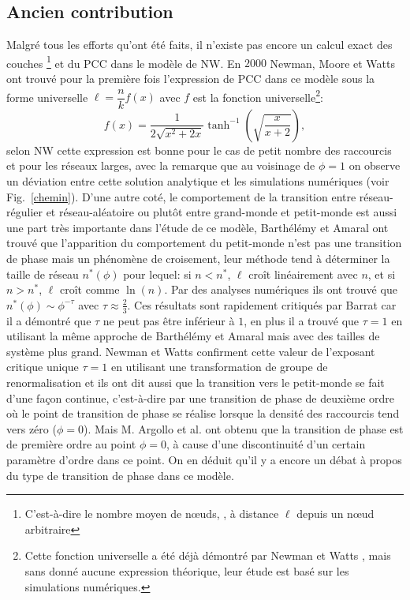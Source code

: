 \subsection{Ancien contribution}
Malgré tous les  efforts qu'ont été faits, il n'existe pas encore un calcul exact des couches \footnote{ C'est-à-dire le nombre moyen de nœuds, \nl, à distance $\ell$ depuis un nœud arbitraire} et du PCC dans le modèle de NW. En $2000$ Newman, Moore et Watts \cite{Newman-al2000} ont trouvé pour la première fois l'expression de PCC dans ce modèle sous la forme universelle $\ell=\dfrac{n}{k}f(x)$ avec $f$ est la fonction universelle\footnote{Cette fonction universelle a été déjà démontré par Newman et Watts \cite{Newman-Watts1999}, mais sans donné aucune expression théorique, leur étude est basé sur les simulations numériques.}:
\begin{equation}
f(x)=\frac{1}{2\sqrt{x^2+2x}}\tanh^{-1}(\sqrt{\frac{x}{x+2}}),\label{eq-ws}
\end{equation}
 selon NW cette expression est bonne pour le cas de petit nombre des raccourcis et pour les réseaux larges, avec la remarque que au voisinage de $\phi=1$ on observe un déviation entre 
 cette solution analytique et les simulations numériques (voir Fig.~\ref{chemin}). D'une autre coté, le comportement de la transition entre  réseau-régulier et  réseau-aléatoire ou plutôt entre  grand-monde et petit-monde est aussi une part très importante dans l'étude de ce modèle, Barthélémy et Amaral \cite{Barthelemy-Amaral1999} ont trouvé que l'apparition du comportement du petit-monde n'est pas une transition de phase mais un phénomène de croisement, leur méthode tend à déterminer la taille de réseau $n^*(\phi)$ pour lequel: si $n<n^*$, $\ell$ croît linéairement avec $n$, et si $n>n^*$, $\ell$ croît comme $\ln(n)$. Par des analyses numériques ils ont trouvé que $n^*(\phi)\sim\phi^{-\tau}$ avec 
$\tau\approx\frac{2}{3}$. Ces résultats sont rapidement critiqués par Barrat \cite{Barrat} car il a démontré que $\tau$ ne peut pas être inférieur à $1$, en plus il a trouvé que $\tau=1$ en utilisant la m\^{e}me approche de Barthélémy et Amaral mais avec
des tailles de système plus grand. Newman et Watts \cite{Newman-Watts1999-2,Newman-Watts1999-3} confirment cette valeur de l'exposant critique unique $\tau=1$ en utilisant une transformation de groupe de renormalisation et ils ont dit aussi que la transition vers le petit-monde se fait d'une façon continue, c'est-à-dire par une transition de phase de deuxième ordre où le point de transition de phase se réalise lorsque la densité des raccourcis tend vers zéro ($\phi=0$). Mais M. Argollo et al. \cite{Argollo-al2000} ont obtenu que la transition de phase
est de première ordre au point $\phi=0$, à cause d'une discontinuité d'un certain paramètre d'ordre dans ce point. On en déduit qu'il y a  encore un débat à propos du type de transition de phase dans ce modèle.
